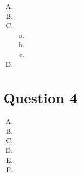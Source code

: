 \documentclass{article}
\begin{document}
\begin{enumerate}[A.]
    \item
    \item
    \item
        \begin{enumerate}[a.]
            \item
            \item
            \item
        \end{enumerate}
    \item
\end{enumerate}

\section*{Question 4}

\begin{enumerate}[A.]
    \item
    \item
    \item
    \item
    \item
    \item
\end{enumerate}
\end{document}
